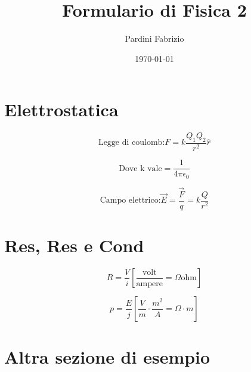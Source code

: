 \documentclass[a4paper,11pt]{article}
\begin{document}
	
	\setlength{\abovedisplayskip}{0pt}
	\setlength{\belowdisplayskip}{0pt}
	
	\title{\Large\bfseries Formulario di Fisica 2\vspace{-1em}}
	\author{Pardini Fabrizio\vspace{-1cm}}
	\date{\today\vspace{-1em}}
	\maketitle
	
	\begin{multicols}{3}
		\setlength{\columnseprule}{0.03pt}
		\def\columnseprulecolor{\color{black}}
		
		\section{Elettrostatica}
		
		
		\begin{equation}
			\text{Legge di coulomb:}F=k\frac{Q_{1}Q_{2}}{r^{2}}\hat{r}
		\end{equation}
	
		\begin{equation}
			\text{Dove k vale}=\frac{1}{4\pi\epsilon_{0}}
		\end{equation}
	
		
		\begin{equation}
			\text{Campo elettrico:}\vec{E}=\frac{\vec{F}}{q}=k\frac{Q}{r^{2}}
		\end{equation}
	
	
		\section{Res, Res e Cond}
		
		\begin{equation}
			R=\frac{V}{i} \left[
			\frac{\text{volt}}{\text{ampere}}=\Omega\text{ohm}
			\right]
		\end{equation}
	
		\begin{equation}
			p=\frac{E}{j} \left[
			\frac{V}{m} \cdot \frac{m^{2}}{A} = \Omega \cdot m
			\right]
		\end{equation}
		
		
		\section{Altra sezione di esempio}
		

\end{multicols}
\end{document}
